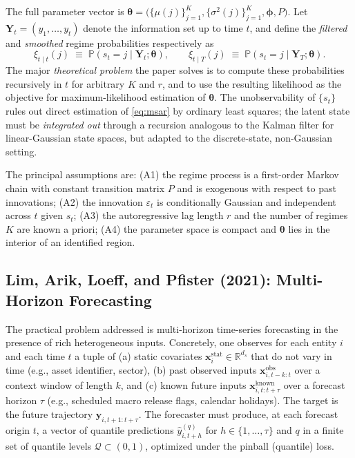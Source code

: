 \documentclass[11pt]{article}
\begin{document}
The full parameter vector is $\bm{\theta} = \bigl( \{\mu(j)\}_{j=1}^{K}, \{\sigma^2(j)\}_{j=1}^{K}, \bm{\phi}, P \bigr)$.  Let $\bm{Y}_t = (y_1,\dots,y_t)$ denote the information set up to time $t$, and define the \emph{filtered} and \emph{smoothed} regime probabilities respectively as
\begin{equation}
    \xi_{t \mid t}(j) \;\equiv\; \mathbb{P}(s_t = j \mid \bm{Y}_t; \bm{\theta}), \qquad
    \xi_{t \mid T}(j) \;\equiv\; \mathbb{P}(s_t = j \mid \bm{Y}_T; \bm{\theta}).
\end{equation}
The major \emph{theoretical problem} the paper solves is to compute these probabilities recursively in $t$ for arbitrary $K$ and $r$, and to use the resulting likelihood as the objective for maximum-likelihood estimation of $\bm{\theta}$.  The unobservability of $\{s_t\}$ rules out direct estimation of \eqref{eq:msar} by ordinary least squares; the latent state must be \emph{integrated out} through a recursion analogous to the Kalman filter for linear-Gaussian state spaces, but adapted to the discrete-state, non-Gaussian setting.

The principal assumptions are:
(A1) the regime process is a first-order Markov chain with constant transition matrix $P$ and is exogenous with respect to past innovations;
(A2) the innovation $\varepsilon_t$ is conditionally Gaussian and independent across $t$ given $s_t$;
(A3) the autoregressive lag length $r$ and the number of regimes $K$ are known a priori;
(A4) the parameter space is compact and $\bm{\theta}$ lies in the interior of an identified region.

\subsection{Lim, Arik, Loeff, and Pfister (2021): Multi-Horizon Forecasting}

The practical problem addressed is multi-horizon time-series forecasting in the presence of rich heterogeneous inputs.  Concretely, one observes for each entity $i$ and each time $t$ a tuple of (a) static covariates $\bm{x}_i^{\text{stat}} \in \mathbb{R}^{d_s}$ that do not vary in time (e.g., asset identifier, sector), (b) past observed inputs $\bm{x}_{i,t-k:t}^{\text{obs}}$ over a context window of length $k$, and (c) known future inputs $\bm{x}_{i,t:t+\tau}^{\text{known}}$ over a forecast horizon $\tau$ (e.g., scheduled macro release flags, calendar holidays).  The target is the future trajectory $\bm{y}_{i,t+1:t+\tau}$.  The forecaster must produce, at each forecast origin $t$, a vector of quantile predictions $\hat{y}_{i,t+h}^{(q)}$ for $h \in \{1,\dots,\tau\}$ and $q$ in a finite set of quantile levels $\mathcal{Q} \subset (0,1)$, optimized under the pinball (quantile) loss.
\end{document}
